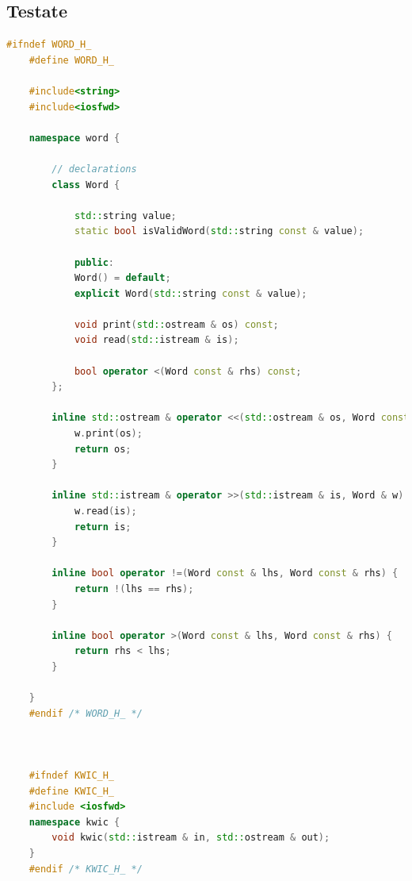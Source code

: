 \clearpage

\subsection{Testate}
\begin{lstlisting}[language=C++, caption=Basic Header File]
	#ifndef WORD_H_
	#define WORD_H_
	
	#include<string>
	#include<iosfwd>
	
	namespace word {
		
		// declarations
		class Word {
			
			std::string value;
			static bool isValidWord(std::string const & value);
			
			public:
			Word() = default;
			explicit Word(std::string const & value);
			
			void print(std::ostream & os) const;
			void read(std::istream & is);
			
			bool operator <(Word const & rhs) const;
		};
		
		inline std::ostream & operator <<(std::ostream & os, Word const & w) {
			w.print(os);
			return os;
		}
		
		inline std::istream & operator >>(std::istream & is, Word & w) {
			w.read(is);
			return is;
		}
		
		inline bool operator !=(Word const & lhs, Word const & rhs) {
			return !(lhs == rhs);
		}
		
		inline bool operator >(Word const & lhs, Word const & rhs) {
			return rhs < lhs;
		}
		
	}
	#endif /* WORD_H_ */
	
	
	
	#ifndef KWIC_H_
	#define KWIC_H_
	#include <iosfwd>
	namespace kwic {
		void kwic(std::istream & in, std::ostream & out);
	}
	#endif /* KWIC_H_ */
\end{lstlisting}

\clearpage

